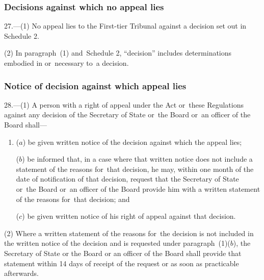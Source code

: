 \documentclass[12pt,a4paper]{article}
\begin{document}
\subsubsection[27. Decisions against which no appeal lies]{Decisions against which no appeal lies}

27.—(1) No appeal lies to 
the First-tier Tribunal  %
against a decision set out in Schedule 2.

(2) In paragraph~(1) and~Schedule 2, “decision” includes determinations embodied in or~necessary to~a decision.



\subsubsection[28. Notice of decision against which appeal lies]{Notice of decision against which appeal lies}

28.—(1) A person with a right of appeal under the Act or~these Regulations against any decision of the Secretary of State 
or~the Board or~an officer of the Board  %
shall—
\begin{enumerate}\item[]
($a$) be given written notice of the decision against which the appeal lies;

($b$) be informed that, in a case where that written notice does not include a statement of the reasons for~that decision, he may, within one month of the date of notification of that decision, request that the Secretary of State 
or~the Board or~an officer of the Board  %
provide him with a written statement of the reasons for~that decision; and

($c$) be given written notice of his right of appeal against that decision.
\end{enumerate}

(2) Where a written statement of the reasons for~the decision is not included in the written notice of the decision and is requested under paragraph~(1)($b$), the Secretary of State 
or the Board or an officer of the Board  %
shall provide that statement within 14 days of receipt of the request
or as soon as practicable afterwards.  %
\end{document}
